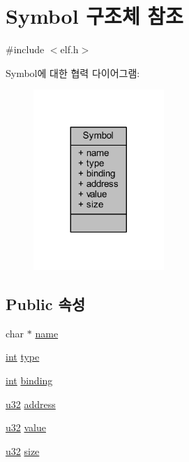 \hypertarget{struct_symbol}{}\section{Symbol 구조체 참조}
\label{struct_symbol}


{\ttfamily \#include $<$elf.\+h$>$}



Symbol에 대한 협력 다이어그램\+:\nopagebreak
\begin{figure}[H]
\begin{center}
\leavevmode
\includegraphics[width=140pt]{struct_symbol__coll__graph}
\end{center}
\end{figure}
\subsection*{Public 속성}
\begin{DoxyCompactItemize}
\item 
char $\ast$ \mbox{\hyperlink{struct_symbol_aa9ba617cd9de17ed73148893a6c14606}{name}}
\item 
\mbox{\hyperlink{_util_8cpp_a0ef32aa8672df19503a49fab2d0c8071}{int}} \mbox{\hyperlink{struct_symbol_a3a8a7698da2e96f2fd77296b5191ce6f}{type}}
\item 
\mbox{\hyperlink{_util_8cpp_a0ef32aa8672df19503a49fab2d0c8071}{int}} \mbox{\hyperlink{struct_symbol_a7b846956436c2911e3b316bf06b080fd}{binding}}
\item 
\mbox{\hyperlink{_system_8h_a10e94b422ef0c20dcdec20d31a1f5049}{u32}} \mbox{\hyperlink{struct_symbol_a410b524fa23be6c41b1de68c9b620226}{address}}
\item 
\mbox{\hyperlink{_system_8h_a10e94b422ef0c20dcdec20d31a1f5049}{u32}} \mbox{\hyperlink{struct_symbol_aefbe563b4964a3cc4ee85c3efaccb7d2}{value}}
\item 
\mbox{\hyperlink{_system_8h_a10e94b422ef0c20dcdec20d31a1f5049}{u32}} \mbox{\hyperlink{struct_symbol_a1ce0cce2939edefe73195657c6371f56}{size}}
\end{DoxyCompactItemize}


